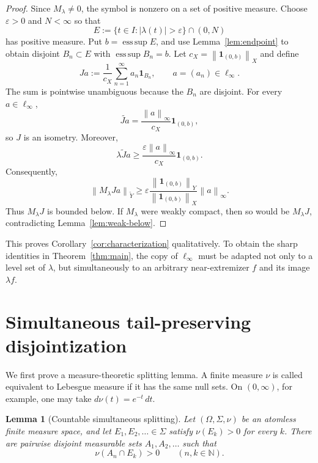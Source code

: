 \documentclass[11pt]{article}
\newtheorem{lemma}[theorem]{Lemma}
\theoremstyle{remark}
\newcommand{\esssup}{\operatorname*{ess\,sup}}
\newcommand{\tY}{\widetilde Y}
\newcommand{\norm}[1]{\left\lVert #1\right\rVert}
\newcommand{\one}{\mathbf 1}
\begin{document}
\begin{proof}
Since $M_\lambda\neq0$, the symbol is nonzero on a set of positive measure.
Choose $\varepsilon>0$ and $N<\infty$ so that
\[
 E:=\{t\in I:|\lambda(t)|>\varepsilon\}\cap(0,N)
\]
has positive measure.  Put $b=\esssup E$, and use Lemma~\ref{lem:endpoint}
to obtain disjoint $B_n\subset E$ with $\esssup B_n=b$.  Let
$c_X=\norm{\one_{(0,b)}}_X$ and define
\[
 Ja:=\frac1{c_X}\sum_{n=1}^\infty a_n\one_{B_n},
 \qquad a=(a_n)\in\ell_\infty.
\]
The sum is pointwise unambiguous because the $B_n$ are disjoint.  For every
$a\in\ell_\infty$,
\[
 \widetilde{Ja}=\frac{\norm{a}_\infty}{c_X}\one_{(0,b)},
\]
so $J$ is an isometry.  Moreover,
\[
 \widetilde{\lambda Ja}
 \geq \frac{\varepsilon\norm{a}_\infty}{c_X}\one_{(0,b)}.
\]
Consequently,
\[
 \norm{M_\lambda Ja}_{\tY}
 \geq \varepsilon\frac{\norm{\one_{(0,b)}}_Y}
                         {\norm{\one_{(0,b)}}_X}\norm{a}_\infty.
\]
Thus $M_\lambda J$ is bounded below.  If $M_\lambda$ were weakly compact,
then so would be $M_\lambda J$, contradicting Lemma~\ref{lem:weak-below}.
\end{proof}

This proves Corollary~\ref{cor:characterization} qualitatively.  To obtain the
sharp identities in Theorem~\ref{thm:main}, the copy of $\ell_\infty$ must be
adapted not only to a level set of $\lambda$, but simultaneously to an
arbitrary near-extremizer $f$ and its image $\lambda f$.

\section{Simultaneous tail-preserving disjointization}

We first prove a measure-theoretic splitting lemma.  A finite measure
$\nu$ is called equivalent to Lebesgue measure if it has the same null sets.
On $(0,\infty)$, for example, one may take $d\nu(t)=e^{-t}\,dt$.

\begin{lemma}[Countable simultaneous splitting]\label{lem:split}
Let $(\Omega,\Sigma,\nu)$ be an atomless finite measure space, and let
$E_1,E_2,\ldots\in\Sigma$ satisfy $\nu(E_k)>0$ for every $k$.  There are
pairwise disjoint measurable sets $A_1,A_2,\ldots$ such that
\[
 \nu(A_n\cap E_k)>0\qquad(n,k\in\mathbb N).
\]
\end{lemma}
\end{document}

